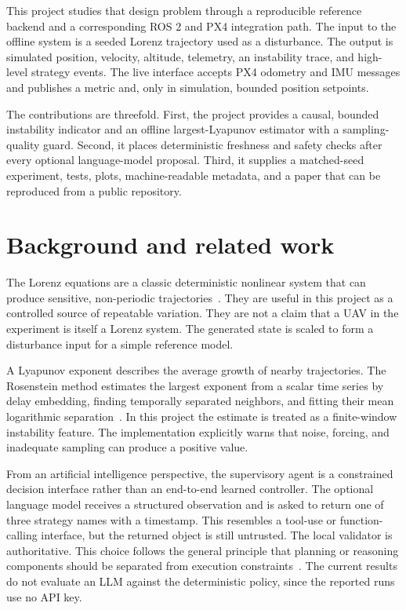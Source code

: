 \documentclass[11pt,a4paper,twocolumn]{article}
\begin{document}
This project studies that design problem through a reproducible reference
backend and a corresponding ROS 2 and PX4 integration path. The input to the
offline system is a seeded Lorenz trajectory used as a disturbance. The output
is simulated position, velocity, altitude, telemetry, an instability trace, and
high-level strategy events. The live interface accepts PX4 odometry and IMU
messages and publishes a metric and, only in simulation, bounded position
setpoints.

The contributions are threefold. First, the project provides a causal,
bounded instability indicator and an offline largest-Lyapunov estimator with a
sampling-quality guard. Second, it places deterministic freshness and safety
checks after every optional language-model proposal. Third, it supplies a
matched-seed experiment, tests, plots, machine-readable metadata, and a paper
that can be reproduced from a public repository.

\section{Background and related work}
The Lorenz equations are a classic deterministic nonlinear system that can
produce sensitive, non-periodic trajectories~\cite{lorenz}. They are useful in
this project as a controlled source of repeatable variation. They are not a
claim that a UAV in the experiment is itself a Lorenz system. The generated
state is scaled to form a disturbance input for a simple reference model.

A Lyapunov exponent describes the average growth of nearby trajectories. The
Rosenstein method estimates the largest exponent from a scalar time series by
delay embedding, finding temporally separated neighbors, and fitting their
mean logarithmic separation~\cite{rosenstein}. In this project the estimate is
treated as a finite-window instability feature. The implementation explicitly
warns that noise, forcing, and inadequate sampling can produce a positive
value.

From an artificial intelligence perspective, the supervisory agent is a
constrained decision interface rather than an end-to-end learned controller.
The optional language model receives a structured observation and is asked to
return one of three strategy names with a timestamp. This resembles a tool-use
or function-calling interface, but the returned object is still untrusted. The
local validator is authoritative. This choice follows the general principle
that planning or reasoning components should be separated from execution
constraints~\cite{russell2021aima}. The current results do not evaluate an LLM
against the deterministic policy, since the reported runs use no API key.
\end{document}

